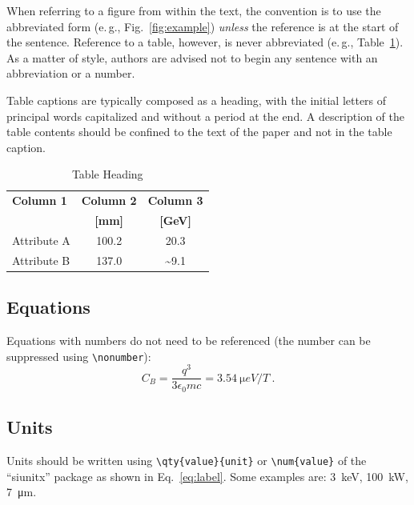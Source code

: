 \documentclass[%
               ]{jacow}
\begin{document}
When referring to a figure from within the text, the
convention is to use the abbreviated form (e.\,g., Fig.~\ref{fig:example})
\emph{unless} the reference is at the start of the sentence. Reference to a
table, however, is never abbreviated (e.\,g., Table~\ref{tab:example}).
As a matter of style, authors are advised not to begin any sentence with an abbreviation or a number.

Table captions are typically composed as a heading, with the initial letters of principal words capitalized and without a period at the end. A description of the table contents should be confined to the text of the paper and not in the table caption. 
\begin{table}[!hbt]
   \centering
   \caption{Table Heading}
   \begin{tabular}{lcc}
       \toprule
       \textbf{Column 1} & \textbf{Column 2} & \textbf{Column 3} \\ 
                         & \textbf{[mm]}     & \textbf{[GeV]}	 \\
       \midrule
          Attribute A    & \num{100.2}       & \num{20.3}        \\
          Attribute B    & \num{137.0}       & \num{~9.1}        \\
       \bottomrule
   \end{tabular}
   \label{tab:example}
\end{table}

\subsection{Equations}


Equations with numbers do not need to be referenced (the number can be suppressed using \verb|\nonumber|):
\begin{equation}\label{eq:label}
    C_B=\frac{q^3}{3\epsilon_{0}mc} = \qty{3.54}{\micro eV/T}\ .
\end{equation}

\subsection{Units}

Units should be written using \verb|\qty{value}{unit}| or \verb|\num{value}| of the “siunitx” package as shown in Eq.~\eqref{eq:label}. Some examples are: \qty{3}{keV}, \qty{100}{kW}, \qty{7}{\um}.
\end{document}

